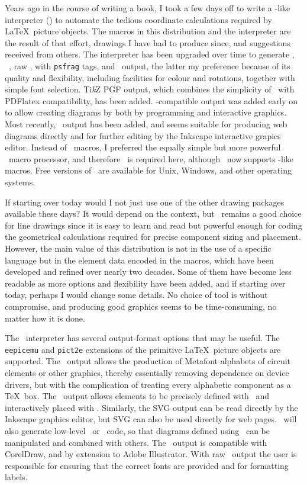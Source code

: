 Years ago in the course of writing a book, I took a few days off to
write a \pic-like interpreter (\dpic) to automate the tedious
coordinate calculations required by \LaTeX\ picture objects.  The
macros in this distribution and the interpreter are the result of that
effort, drawings I have had to produce since, and suggestions received from
others.  The interpreter has been upgraded over time to generate
\mfpic, \MetaPost~\cite{metapost}, raw \Postscript, \Postscript with
{\tt psfrag} tags, and \PSTricks\ output, the latter my preference
because of its quality and flexibility, including facilities for colour
and rotations, together with simple font selection.
Ti{\it k}Z
PGF output, which combines the simplicity of \PSTricks\ with PDFlatex
compatibility, has been added.
\Xfig{}-compatible output was added early on to allow creating diagrams
by both by programming and interactive graphics.
Most recently, \SVG\ output has been added, and seems suitable for
producing web diagrams directly and for further editing by the
Inkscape interactive grapics editor.
Instead of \pic\ macros, I preferred the equally simple
but more powerful \Mfour\ macro processor, and therefore \Mfour\ is
required here, although \dpic\  now supports \pic-like macros.  Free
versions of \Mfour\ are available for Unix, Windows, and other
operating systems.

If starting over today would I not just use one of the other drawing
packages available these days?  It would depend on the context, but
\pic\ remains a good choice for line drawings since it is easy to learn
and read but powerful enough for coding the geometrical calculations
required for precise component sizing and placement. However, the main
value of this distribution is
not in the use of a specific language but in the element data encoded
in the macros, which have been developed and
refined over nearly two decades.  Some of them have become less readable
as more options and flexibility have been added, and if starting over
today, perhaps I would change some details.  No choice of tool is without
compromise, and producing good graphics seems to be time-consuming, no matter
how it is done.

The \dpic\ interpreter has several output-format options that may be
useful.  The {\tt eepicemu} and {\tt pict2e} extensions of the
primitive \LaTeX\ picture objects are supported.  The \mfpic\ output
allows the production of Metafont alphabets of circuit elements or
other graphics, thereby essentially removing dependence on device
drivers, but with the complication of treating every alphabetic
component as a \TeX\ box.  The \xfig\ output allows elements to be
precisely defined with \dpic\  and interactively placed with \xfig.
Similarly, the SVG output can be read directly by the Inkscape graphics
editor, but SVG can also be used directly for web pages.
\Dpic\ will also generate low-level \MetaPost\ or \Postscript\ code, so
that diagrams defined using \pic\ can be manipulated and combined with
others.  The \Postscript\ output is compatible with
CorelDraw\textregistered, and by extension to Adobe
Illustrator\textregistered.  With raw \Postscript\ output the user is
responsible for ensuring that the correct fonts are provided and for
formatting labels.

